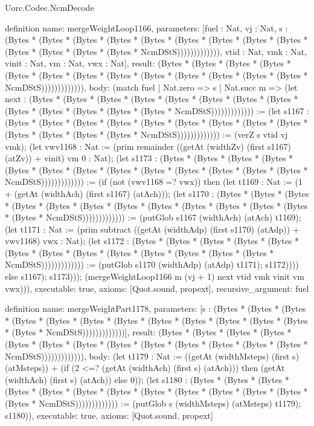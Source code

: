 \begin{lexlean}{Uorc.Codec.NcmDecode}
\begin{semanticmodule}
definition{
  name: mergeWeightLoop1166,
  parameters: [fuel : Nat, vj : Nat, s : (Bytes * (Bytes * (Bytes * (Bytes * (Bytes * (Bytes * (Bytes * (Bytes * (Bytes * (Bytes * (Bytes * (Bytes * (Bytes * NcmDStS))))))))))))), vtid : Nat, vmk : Nat, vinit : Nat, vm : Nat, vwx : Nat],
  result: (Bytes * (Bytes * (Bytes * (Bytes * (Bytes * (Bytes * (Bytes * (Bytes * (Bytes * (Bytes * (Bytes * (Bytes * (Bytes * NcmDStS))))))))))))),
  body: (match fuel
    | Nat.zero => s
    | Nat.succ m => (let next : (Bytes * (Bytes * (Bytes * (Bytes * (Bytes * (Bytes * (Bytes * (Bytes * (Bytes * (Bytes * (Bytes * (Bytes * (Bytes * NcmDStS))))))))))))) := (let s1167 : (Bytes * (Bytes * (Bytes * (Bytes * (Bytes * (Bytes * (Bytes * (Bytes * (Bytes * (Bytes * (Bytes * (Bytes * (Bytes * NcmDStS))))))))))))) := (verZ s vtid vj vmk); (let vwv1168 : Nat := (prim remainder ((getAt (widthZv) (first s1167) (atZv)) + vinit) vm 0 : Nat); (let s1173 : (Bytes * (Bytes * (Bytes * (Bytes * (Bytes * (Bytes * (Bytes * (Bytes * (Bytes * (Bytes * (Bytes * (Bytes * (Bytes * NcmDStS))))))))))))) := (if (not (vwv1168 =? vwx)) then (let t1169 : Nat := (1 + (getAt (widthAch) (first s1167) (atAch))); (let s1170 : (Bytes * (Bytes * (Bytes * (Bytes * (Bytes * (Bytes * (Bytes * (Bytes * (Bytes * (Bytes * (Bytes * (Bytes * (Bytes * NcmDStS))))))))))))) := (putGlob s1167 (widthAch) (atAch) t1169); (let t1171 : Nat := (prim subtract ((getAt (widthAdp) (first s1170) (atAdp)) + vwv1168) vwx : Nat); (let s1172 : (Bytes * (Bytes * (Bytes * (Bytes * (Bytes * (Bytes * (Bytes * (Bytes * (Bytes * (Bytes * (Bytes * (Bytes * (Bytes * NcmDStS))))))))))))) := (putGlob s1170 (widthAdp) (atAdp) t1171); s1172)))) else s1167); s1173))); (mergeWeightLoop1166 m (vj + 1) next vtid vmk vinit vm vwx))),
  executable: true,
  axioms: [Quot.sound, propext],
  recursive_argument: fuel
}

definition{
  name: mergeWeightPart1178,
  parameters: [s : (Bytes * (Bytes * (Bytes * (Bytes * (Bytes * (Bytes * (Bytes * (Bytes * (Bytes * (Bytes * (Bytes * (Bytes * (Bytes * NcmDStS)))))))))))))],
  result: (Bytes * (Bytes * (Bytes * (Bytes * (Bytes * (Bytes * (Bytes * (Bytes * (Bytes * (Bytes * (Bytes * (Bytes * (Bytes * NcmDStS))))))))))))),
  body: (let t1179 : Nat := ((getAt (widthMsteps) (first s) (atMsteps)) + (if (2 <=? (getAt (widthAch) (first s) (atAch))) then (getAt (widthAch) (first s) (atAch)) else 0)); (let s1180 : (Bytes * (Bytes * (Bytes * (Bytes * (Bytes * (Bytes * (Bytes * (Bytes * (Bytes * (Bytes * (Bytes * (Bytes * (Bytes * NcmDStS))))))))))))) := (putGlob s (widthMsteps) (atMsteps) t1179); s1180)),
  executable: true,
  axioms: [Quot.sound, propext]
}


\end{semanticmodule}
\end{lexlean}
